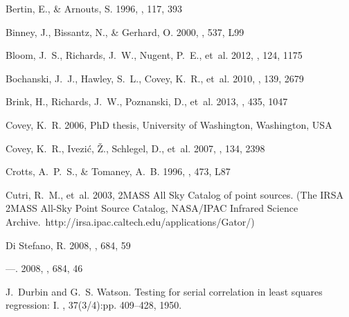 \documentclass{emulateapj}
\begin{document}
\begin{thebibliography}{57}
{Bertin}, E., \& {Arnouts}, S. 1996, \aaps, 117, 393

{Binney}, J., {Bissantz}, N., \& {Gerhard}, O. 2000, \apjl, 537, L99

{Bloom}, J.~S., {Richards}, J.~W., {Nugent}, P.~E., {et~al.} 2012, \pasp, 124,
  1175

{Bochanski}, J.~J., {Hawley}, S.~L., {Covey}, K.~R., {et~al.} 2010, \aj, 139,
  2679

{Brink}, H., {Richards}, J.~W., {Poznanski}, D., {et~al.} 2013, \mnras, 435,
  1047

{Covey}, K.~R. 2006, PhD thesis, University of Washington, Washington, USA

{Covey}, K.~R., {Ivezi{\'c}}, {\v Z}., {Schlegel}, D., {et~al.} 2007, \aj, 134,
  2398

{Crotts}, A.~P.~S., \& {Tomaney}, A.~B. 1996, \apjl, 473, L87

{Cutri}, R.~M., {et~al.} 2003, {2MASS All Sky Catalog of point sources.} (The
  IRSA 2MASS All-Sky Point Source Catalog, NASA/IPAC Infrared Science
  Archive.~http://irsa.ipac.caltech.edu/applications/Gator/)

{Di Stefano}, R. 2008{}, \apj, 684, 59

---. 2008{}, \apj, 684, 46

J.~Durbin and G.~S. Watson.
\newblock Testing for serial correlation in least squares regression: I.
, 37(3/4):pp. 409--428, 1950.


\end{thebibliography}
\end{document}
